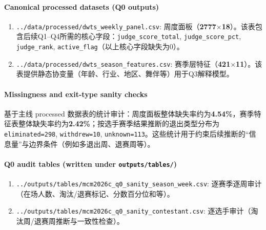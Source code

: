 \paragraph{Canonical processed datasets (Q0 outputs)}
\begin{enumerate}[
    label = (\arabic*),
    itemindent = 0pt,
    labelindent = \parindent,
    labelwidth = 2em,
    labelsep = 5pt,
    leftmargin = 4.5em
    ]
    \item \texttt{../data/processed/dwts\_weekly\_panel.csv}: 周度面板（\textbf{2777$\times$18}）。该表包含后续Q1--Q4所需的核心字段：\texttt{judge\_score\_total}, \texttt{judge\_score\_pct}, \texttt{judge\_rank}, \texttt{active\_flag}（以上核心字段缺失为0）。
    \item \texttt{../data/processed/dwts\_season\_features.csv}: 赛季层特征（\textbf{421$\times$11}）。该表提供静态协变量（年龄、行业、地区、舞伴等）用于Q3解释模型。
\end{enumerate}

\paragraph{Missingness and exit-type sanity checks}
基于主线 processed 数据表的统计审计：周度面板整体缺失率约为\textbf{4.54\%}，赛季特征表整体缺失率约为\textbf{2.42\%}；按选手赛季结果推断的退出类型分布为\texttt{eliminated=298}, \texttt{withdrew=10}, \texttt{unknown=113}。这些统计用于约束后续推断的“信息量”与边界条件（例如多退出周、退赛周等）。

\paragraph{Q0 audit tables (written under \texttt{outputs/tables/})}
\begin{enumerate}[
    label = (\arabic*),
    itemindent = 0pt,
    labelindent = \parindent,
    labelwidth = 2em,
    labelsep = 5pt,
    leftmargin = 4.5em
    ]
    \item \texttt{../outputs/tables/mcm2026c\_q0\_sanity\_season\_week.csv}: 逐赛季逐周审计（在场人数、淘汰/退赛标记、分数百分位和等）。
    \item \texttt{../outputs/tables/mcm2026c\_q0\_sanity\_contestant.csv}: 逐选手审计（淘汰周/退赛周推断与一致性检查）。
\end{enumerate}
